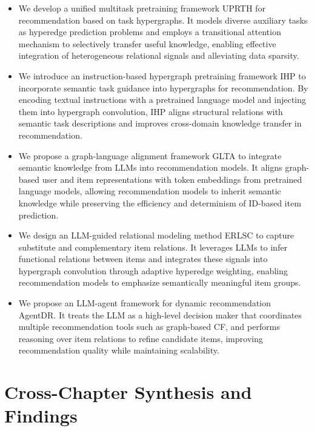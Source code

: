 \begin{itemize}[left=0pt]

\item We develop a unified multitask pretraining framework UPRTH for recommendation based on task hypergraphs.
It models diverse auxiliary tasks as hyperedge prediction problems and employs a transitional attention mechanism to selectively transfer useful knowledge, enabling effective integration of heterogeneous relational signals and alleviating data sparsity.

\item We introduce an instruction-based hypergraph pretraining framework IHP to incorporate semantic task guidance into hypergraphs for recommendation.
By encoding textual instructions with a pretrained language model and injecting them into hypergraph convolution, IHP aligns structural relations with semantic task descriptions and improves cross-domain knowledge transfer in recommendation.

\item We propose a graph-language alignment framework GLTA to integrate semantic knowledge from LLMs into recommendation models.
It aligns graph-based user and item representations with token embeddings from pretrained language models, allowing recommendation models to inherit semantic knowledge while preserving the efficiency and determinism of ID-based item prediction.

\item We design an LLM-guided relational modeling method ERLSC to capture substitute and complementary item relations.
It leverages LLMs to infer functional relations between items and integrates these signals into hypergraph convolution through adaptive hyperedge weighting, enabling recommendation models to emphasize semantically meaningful item groups.

\item We propose an LLM-agent framework for dynamic recommendation AgentDR. It treats the LLM as a high-level decision maker that coordinates multiple recommendation tools such as graph-based CF, and performs reasoning over item relations to refine candidate items, improving recommendation quality while maintaining scalability.

\end{itemize}

\section{Cross-Chapter Synthesis and Findings}

